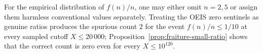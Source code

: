 \begin{remark}
\label{rem:fraiture-undefined-ratios}
For the empirical distribution of $f(n)/n$, one may either omit
$n=2,5$ or assign them harmless conventional values separately.  Treating
the OEIS zero sentinels as genuine ratios produces the spurious count $2$
for the event $f(n)/n\leq1/10$ at every sampled cutoff
$X\leq20\,000$; Proposition~\ref{prop:fraiture-small-ratio} shows that
the correct count is zero even for every $X\leq10^{120}$.
\end{remark}

